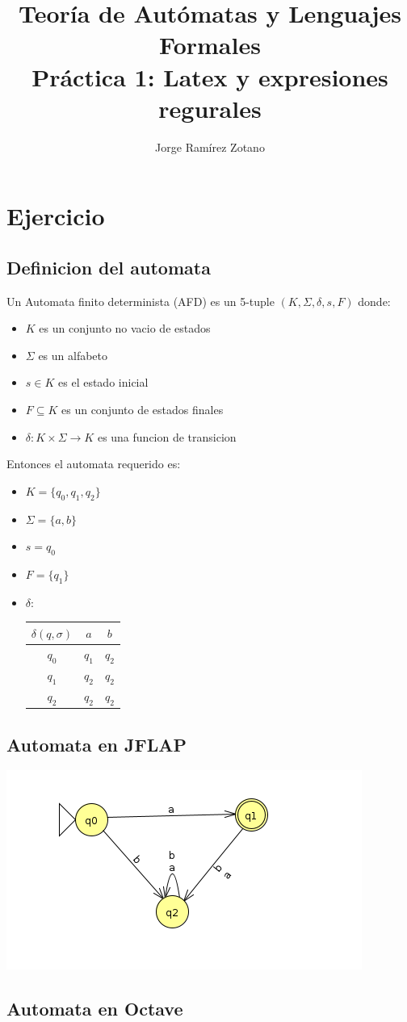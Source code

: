 \documentclass[a4paper]{article}
\title{Teoría de Autómatas y Lenguajes Formales\\[.4\baselineskip]Práctica 1: Latex y expresiones regurales}
\author{Jorge Ramírez Zotano}
\begin{document}
\maketitle
                                                                                                                                
\section{Ejercicio }
\subsection{Definicion del automata}
Un Automata finito determinista (AFD) es un 5-tuple $(K, \Sigma, \delta,s, F)$ donde:\\
\begin{itemize}
\item $K$ es un conjunto no vacio de estados
\item $\Sigma$ es un alfabeto
\item $s \in K$ es el estado inicial
\item $F \subseteq K$ es un conjunto de estados finales
\item $\delta: K \times \Sigma \to K$ es una funcion de transicion
\end{itemize}
Entonces el automata requerido es:
\begin{itemize}
\item $K = \{q_{0},q_{1},q_{2}\}$ 
\item $\Sigma = \{a, b\}$ 
\item $s = q_{0}$ 
\item $F = \{q_{1}\}$ 
\item $\delta: $ \begin{table}[h!]
\begin{tabular}{c|c|c}
  $\delta(q,\sigma)$ & $a$ & $b$\\
  \hline
  $q_0$& $q_1$ & $q_2$\\
  \hline
  $q_1$& $q_2$ & $q_2$\\
  \hline
  $q_2$& $q_2$ & $q_2$
\end{tabular}
\end{table}

\end{itemize}
\subsection{Automata en JFLAP}

\includegraphics{Automata}

\subsection{Automata en Octave}

 
\end{document}
